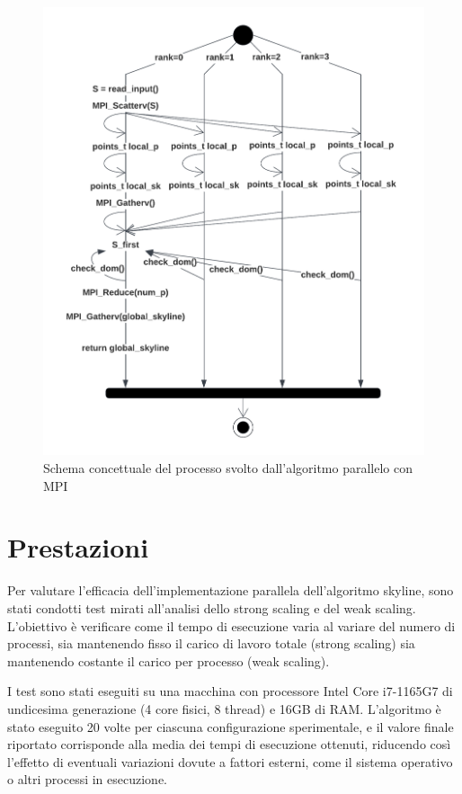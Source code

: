 \documentclass[letterpaper,11pt,leqno]{article}
\begin{document}
\begin{figure}[h]
    \centering
    \includegraphics[scale=0.6]{MPI.pdf}
    \caption{Schema concettuale del processo svolto dall'algoritmo parallelo con MPI}
    \label{f:graph2}
\end{figure}




\section{Prestazioni}

Per valutare l'efficacia dell'implementazione parallela dell'algoritmo skyline, sono stati condotti test mirati all'analisi dello strong scaling e del weak scaling. L'obiettivo è verificare come il tempo di esecuzione varia al variare del numero di processi, sia mantenendo fisso il carico di lavoro totale (strong scaling) sia mantenendo costante il carico per processo (weak scaling).  

I test sono stati eseguiti su una macchina con processore Intel Core i7-1165G7 di undicesima generazione (4 core fisici, 8 thread) e 16GB di RAM. L'algoritmo è stato eseguito 20 volte per ciascuna configurazione sperimentale, e il valore finale riportato corrisponde alla media dei tempi di esecuzione ottenuti, riducendo così l'effetto di eventuali variazioni dovute a fattori esterni, come il sistema operativo o altri processi in esecuzione.  
\end{document}
